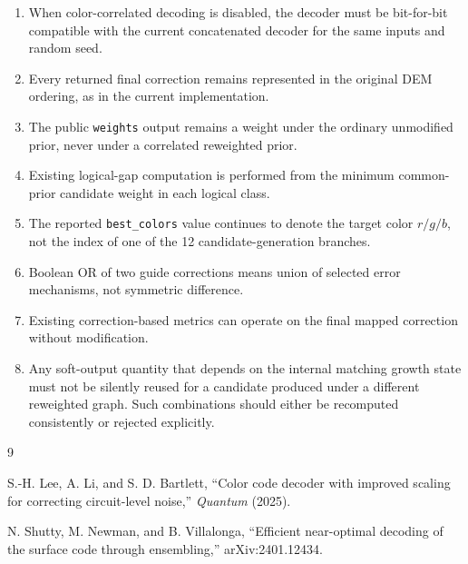\documentclass[11pt]{article}
\begin{document}
\begin{enumerate}[leftmargin=2em]
    \item When color-correlated decoding is disabled, the decoder must be bit-for-bit
    compatible with the current concatenated decoder for the same inputs and random
    seed.
    \item Every returned final correction remains represented in the original DEM
    ordering, as in the current implementation.
    \item The public \texttt{weights} output remains a weight under the ordinary
    unmodified prior, never under a correlated reweighted prior.
    \item Existing logical-gap computation is performed from the minimum
    common-prior candidate weight in each logical class.
    \item The reported \texttt{best\_colors} value continues to denote the target
    color $r/g/b$, not the index of one of the 12 candidate-generation branches.
    \item Boolean OR of two guide corrections means union of selected error mechanisms,
    not symmetric difference.
    \item Existing correction-based metrics can operate on the final mapped correction
    without modification.
    \item Any soft-output quantity that depends on the internal matching growth state
    must not be silently reused for a candidate produced under a different reweighted
    graph.  Such combinations should either be recomputed consistently or rejected
    explicitly.
\end{enumerate}

\begin{thebibliography}{9}

S.-H. Lee, A. Li, and S. D. Bartlett,
``Color code decoder with improved scaling for correcting circuit-level noise,''
\emph{Quantum} (2025).

N. Shutty, M. Newman, and B. Villalonga,
``Efficient near-optimal decoding of the surface code through ensembling,''
arXiv:2401.12434.

\end{thebibliography}
\end{document}
